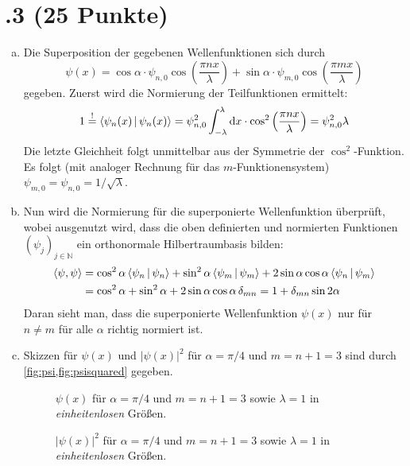 \section*{\nr.3 \titthree (25 Punkte)}
\begin{enumerate}[(a)]
\item Die Superposition der gegebenen Wellenfunktionen sich durch
\begin{equation}
\psi(x) = \cos{\alpha}\cdot\psi_{n,0}\cos{\left(\frac{\pi n x}{\lambda}\right)} + \sin{\alpha}\cdot\psi_{m,0}\cos{\left(\frac{\pi m x}{\lambda}\right)}
\end{equation}
gegeben. Zuerst wird die Normierung der Teilfunktionen ermittelt:
\begin{equation}
1 \overset{!}{=} \Braket{\psi_n (x)|\psi_n(x)} = \psi_{n,0}^2 \int_{-\lambda}^{\lambda}\mathrm{d}x \cdot {\cos^2{\left(\frac{\pi n x}{\lambda}\right)}} = \psi_{n,0}^2  \lambda
\end{equation}
Die letzte Gleichheit folgt unmittelbar aus der Symmetrie der $\cos^2$-Funktion. Es folgt (mit analoger Rechnung für das $m$-Funktionensystem) $\psi_{m,0} = \psi_{n,0} = 1/\sqrt{\lambda}$.

\item Nun wird die Normierung für die superponierte Wellenfunktion überprüft, wobei ausgenutzt wird, dass die oben definierten und normierten Funktionen $(\psi_j)_{j\in\mathbb{N}}$ ein orthonormale Hilbertraumbasis bilden:
\begin{align}
\Braket{\psi,\psi} &= \cos^2{\alpha} \Braket{\psi_n|\psi_n} + \sin^2{\alpha} \Braket{\psi_m|\psi_m} + 2 \sin{\alpha}\cos{\alpha}\Braket{\psi_n|\psi_m} \\
&= \cos^2\alpha + \sin^2 \alpha + 2\sin\alpha\cos\alpha \, \delta_{mn} = 1 + \delta_{mn}\sin {2\alpha}
\end{align}
Daran sieht man, dass die superponierte Wellenfunktion $\psi(x)$ nur für $n\neq m$ für alle $\alpha$ richtig normiert ist.
\item Skizzen für $\psi(x)$ und $|\psi(x)|^2$ für $\alpha=\pi/4$ und $m=n+1=3$ sind durch \vref{fig:psi,fig:psisquared} gegeben.
\begin{figure}[htbp]
\centering

\caption{$\psi(x)$ für $\alpha=\pi/4$ und $m=n+1=3$ sowie $\lambda=1$ in \emph{einheitenlosen} Größen.}
\label{fig:psi}
\end{figure}
\begin{figure}[htbp]
\centering

\caption{$|\psi(x)|^2$ für $\alpha=\pi/4$ und $m=n+1=3$ sowie $\lambda=1$ in \emph{einheitenlosen} Größen.}
\label{fig:psisquared}
\end{figure}
\end{enumerate}